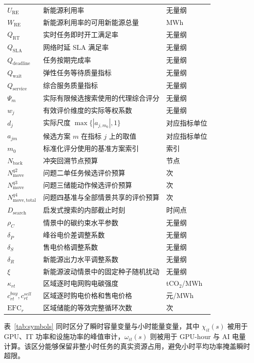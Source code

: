 \documentclass[withoutpreface,bwprint]{cumcmthesis}
\begin{document}
{\begin{longtable}{lll}
$U_{\mathrm{RE}}$ & 新能源利用率 & 无量纲 \\
$W_{\mathrm{RE}}$ & 新能源利用率的可用新能源总量 & MWh \\
$Q_{\mathrm{RT}}$ & 实时任务即时开工满足率 & 无量纲 \\
$Q_{\mathrm{SLA}}$ & 网络时延 SLA 满足率 & 无量纲 \\
$Q_{\mathrm{deadline}}$ & 任务按期完成率 & 无量纲 \\
$Q_{\mathrm{wait}}$ & 弹性任务等待质量指标 & 无量纲 \\
$Q_{\mathrm{service}}$ & 综合服务质量指标 & 无量纲 \\
$\Psi_m$ & 实际有限候选搜索使用的代理综合评分 & 无量纲 \\
$w_j$ & 有效评价维度的实际等权系数 & 无量纲 \\
$d_j$ & 实际尺度 $\max\{|a_{j,m_0}|,1\}$ & 对应指标单位 \\
$a_{jm}$ & 候选方案 $m$ 在指标 $j$ 上的取值 & 对应指标单位 \\
$m_0$ & 标准化评分使用的基准方案索引 & 索引 \\
$N_{\mathrm{back}}$ & 冲突回溯节点预算 & 节点 \\
$N_{\mathrm{move}}^{q2}$ & 问题二单任务候选评价预算 & 次 \\
$N_{\mathrm{move}}^{q3}$ & 问题三储能动作候选评价预算 & 次 \\
$N_{\mathrm{move,total}}^{q4}$ & 问题四基准与全部情景共享的评价预算 & 次 \\
$D_{\mathrm{search}}$ & 启发式搜索的内部截止时刻 & 时间点 \\
$\rho_C$ & 情景中的碳约束水平参数 & 无量纲 \\
$\delta_P$ & 峰谷电价差调整系数 & 无量纲 \\
$\delta_S$ & 售电价格调整系数 & 无量纲 \\
$\delta_R$ & 新能源出力水平调整系数 & 无量纲 \\
$\xi$ & 新能源波动情景中的固定种子随机扰动 & 无量纲 \\
$\kappa_{rt}$ & 区域逐时电网购电碳强度 & tCO$_2$/MWh \\
$c_{rt}^{buy},c_{rt}^{sell}$ & 区域逐时购电价格和售电价格 & 元/MWh \\
$\mathrm{EFC}_r$ & 区域储能的等效完整循环次数 & 次 \\
\end{longtable}
}

表~\ref{tab:symbols} 同时区分了瞬时容量变量与小时能量变量，其中 $\chi_{it}(s)$ 被用于 GPU、IT 功率和设施功率的峰值审计，$\omega_{it}(s)$ 则被用于 GPU-hour 与 AI 电量计算。该区分能够保留非整小时任务的真实资源占用，避免小时平均功率掩盖瞬时超限。
\end{document}
